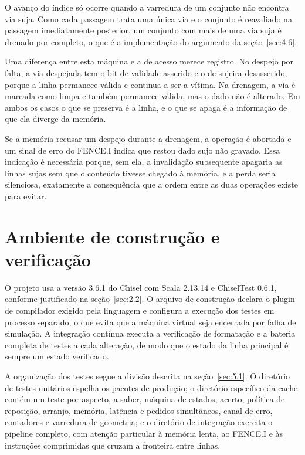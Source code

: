 O avanço do índice só ocorre quando a varredura de um conjunto não encontra via suja. Como cada passagem trata uma única via e o conjunto é reavaliado na passagem imediatamente posterior, um conjunto com mais de uma via suja é drenado por completo, o que é a implementação do argumento da seção~\ref{sec:4.6}.

Uma diferença entre esta máquina e a de acesso merece registro. No despejo por falta, a via despejada tem o bit de validade asserido e o de sujeira desasserido, porque a linha permanece válida e continua a ser a vítima. Na drenagem, a via é marcada como limpa e também permanece válida, mas o dado não é alterado. Em ambos os casos o que se preserva é a linha, e o que se apaga é a informação de que ela diverge da memória.

Se a memória recusar um despejo durante a drenagem, a operação é abortada e um sinal de erro do FENCE.I indica que restou dado sujo não gravado. Essa indicação é necessária porque, sem ela, a invalidação subsequente apagaria as linhas sujas sem que o conteúdo tivesse chegado à memória, e a perda seria silenciosa, exatamente a consequência que a ordem entre as duas operações existe para evitar.

\section{Ambiente de construção e verificação}\label{sec:5.9}

O projeto usa a versão 3.6.1 do Chisel com Scala 2.13.14 e ChiselTest 0.6.1, conforme justificado na seção~\ref{sec:2.2}. O arquivo de construção declara o plugin de compilador exigido pela linguagem e configura a execução dos testes em processo separado, o que evita que a máquina virtual seja encerrada por falha de simulação. A integração contínua executa a verificação de formatação e a bateria completa de testes a cada alteração, de modo que o estado da linha principal é sempre um estado verificado.

A organização dos testes segue a divisão descrita na seção~\ref{sec:5.1}. O diretório de testes unitários espelha os pacotes de produção; o diretório específico da cache contém um teste por aspecto, a saber, máquina de estados, acerto, política de reposição, arranjo, memória, latência e pedidos simultâneos, canal de erro, contadores e varredura de geometria; e o diretório de integração exercita o pipeline completo, com atenção particular à memória lenta, ao FENCE.I e às instruções comprimidas que cruzam a fronteira entre linhas.

